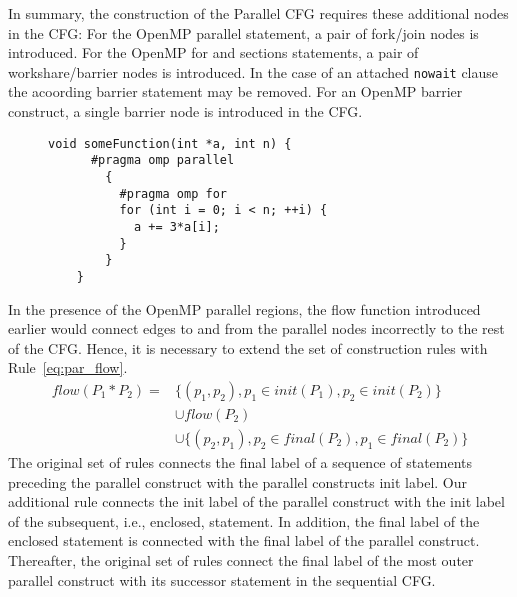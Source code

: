 \documentclass[natbib]{article}
\begin{document}
In summary, the construction of the Parallel CFG requires these additional nodes in the CFG:
For the OpenMP parallel statement, a pair of fork/join nodes is introduced.
For the OpenMP for and sections statements, a pair of workshare/barrier nodes is introduced.
In the case of an attached \texttt{nowait} clause the acoording barrier statement may be removed.
For an OpenMP barrier construct, a single barrier node is introduced in the CFG.
\begin{figure}
  \begin{lstlisting}[label=lst:omp_example, caption={This is the caption of the listing}]
    void someFunction(int *a, int n) {
      #pragma omp parallel
        {
          #pragma omp for
          for (int i = 0; i < n; ++i) {
            a += 3*a[i];
          }
        }
    }
  \end{lstlisting}
\end{figure}
In the presence of the OpenMP parallel regions, the flow function introduced earlier would connect edges to and from the parallel nodes incorrectly to the rest of the CFG.
Hence, it is necessary to extend the set of construction rules with Rule~\ref{eq:par_flow}.
\begin{equation}\label{eq:par_flow}
\begin{split}
flow(P_1*P_2) ={} & \{(p_1,p_2), p_1 \in init(P_1), p_2 \in init(P_2)\} \\
              & \cup flow(P_2) \\ 
              & \cup \{(p_2, p_1), p_2 \in final(P_2), p_1 \in final(P_2)\}
\end{split}
\end{equation}
The original set of rules connects the final label of a sequence of statements preceding the parallel construct with the parallel constructs init label.
Our additional rule connects the init label of the parallel construct with the init label of the subsequent, i.e., enclosed, statement.
In addition, the final label of the enclosed statement is connected with the final label of the parallel construct.
Thereafter, the original set of rules connect the final label of the most outer parallel construct with its successor statement in the sequential CFG.
\end{document}
